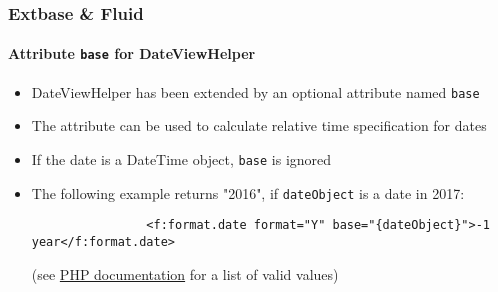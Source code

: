 \begin{frame}[fragile]
	\frametitle{Extbase \& Fluid}
	\framesubtitle{Attribute \texttt{base} for DateViewHelper}


	\begin{itemize}

		\item DateViewHelper has been extended by an optional attribute named \texttt{base}
		\item The attribute can be used to calculate relative time specification for dates
		\item If the date is a DateTime object, \texttt{base} is ignored
		\item The following example returns "2016", if \texttt{dateObject} is a date in 2017:

			\begin{lstlisting}
				<f:format.date format="Y" base="{dateObject}">-1 year</f:format.date>
			\end{lstlisting}

		\small
			(see \href{http://www.php.net/manual/en/datetime.formats.relative.php}{PHP documentation} for a list of valid values)
		\normalsize

	\end{itemize}

\end{frame}


